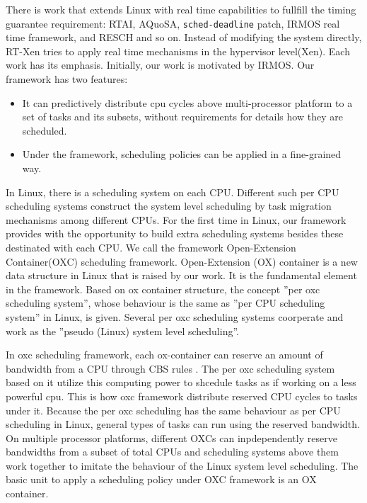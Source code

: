 There is work that extends Linux with real time capabilities to fullfill 
the timing guarantee requirement: RTAI\cite{rtai}, AQuoSA\cite{Luigi09}, 
\texttt{sched-deadline} patch\cite{Dario09}, 
IRMOS real time framework, and RESCH and so on.
Instead of modifying the system directly, RT-Xen tries to apply real 
time mechanisms in the hypervisor level(Xen). Each work has its emphasis. 
Initially, our work is motivated by IRMOS. Our framework has two features:
\begin{itemize}
\item 	It can predictively distribute cpu cycles above multi-processor 
	platform to a set of tasks and its subsets, without requirements 
	for details how they are scheduled. 
\item 	Under the framework, scheduling policies can be applied in a
	fine-grained way.
\end{itemize}

In Linux, there is a scheduling system on each CPU. Different such per
CPU scheduling systems construct the system level scheduling by task
migration mechanisms among different CPUs. For the first time in Linux, 
our framework provides with the opportunity to build extra scheduling 
systems besides these destinated with each CPU. We call the framework 
Open-Extension Container(OXC) scheduling framework. Open-Extension (OX) 
container is a new data structure in Linux that is raised by our work. 
It is the fundamental element in the framework. Based on ox container 
structure, the concept ''per oxc scheduling system'', whose 
behaviour is the same as ''per CPU scheduling system'' in Linux, is 
given. Several per oxc scheduling systems coorperate and work as the 
''pseudo (Linux) system level scheduling''.  

In oxc scheduling framework, each ox-container can reserve an amount of
bandwidth from a CPU through CBS rules \cite{AbeniB98}. The per oxc 
scheduling system based on it utilize this computing power to shcedule 
tasks as if working on a less powerful cpu. This is how oxc framework 
distribute reserved CPU cycles to tasks under it. Because the per oxc 
scheduling has the same behaviour as per CPU scheduling in Linux, 
general types of tasks can run using the reserved bandwidth. On multiple
processor platforms, different OXCs can inpdependently reserve bandwidths 
from a subset of total CPUs and scheduling systems above them work together 
to imitate the behaviour of the Linux system level scheduling. The basic 
unit to apply a scheduling policy under OXC framework is an OX container.
